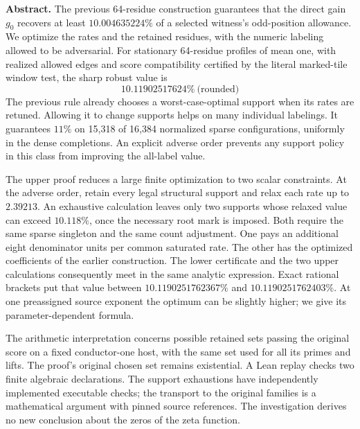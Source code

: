 \textbf{Abstract.} The previous 64-residue construction guarantees that the direct gain \(g_0\) recovers at least \(10.004635224\%\) of a selected witness's odd-position allowance. We optimize the rates and the retained residues, with the numeric labeling allowed to be adversarial. For stationary 64-residue profiles of mean one, with realized allowed edges and score compatibility certified by the literal marked-tile window test, the sharp robust value is
\[
                \boxed{10.11902517624\%\ \text{(rounded)}}
\]
The previous rule already chooses a worst-case-optimal support when its rates are retuned. Allowing it to change supports helps on many individual labelings. It guarantees \(11\%\) on 15,318 of 16,384 normalized sparse configurations, uniformly in the dense completions. An explicit adverse order prevents any support policy in this class from improving the all-label value.

The upper proof reduces a large finite optimization to two scalar constraints. At the adverse order, retain every legal structural support and relax each rate up to \(2.39213\). An exhaustive calculation leaves only two supports whose relaxed value can exceed \(10.118\%\), once the necessary root mark is imposed. Both require the same sparse singleton and the same count adjustment. One pays an additional eight denominator units per common saturated rate. The other has the optimized coefficients of the earlier construction. The lower certificate and the two upper calculations consequently meet in the same analytic expression. Exact rational brackets put that value between \(10.1190251762367\%\) and \(10.1190251762403\%\). At one preassigned source exponent the optimum can be slightly higher; we give its parameter-dependent formula.

The arithmetic interpretation concerns possible retained sets passing the original score on a fixed conductor-one host, with the same set used for all its primes and lifts. The proof's original chosen set remains existential. A Lean replay checks two finite algebraic declarations. The support exhaustions have independently implemented executable checks; the transport to the original families is a mathematical argument with pinned source references. The investigation derives no new conclusion about the zeros of the zeta function.
